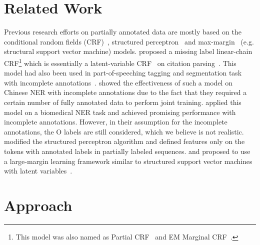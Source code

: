 \section{Related Work}
Previous research efforts on partially annotated data are mostly based on the conditional random fields (CRF)~\cite{lafferty2001conditional}, structured perceptron~\cite{collins2002discriminative} and max-margin~\cite{tsochantaridis2005large} (e.g. structural support vector machine) models.
\citet{bellare2007learning} proposed a missing label linear-chain CRF\footnote{This model was also named as Partial CRF~\cite{carlson2009learning} and EM Marginal CRF~\cite{greenberg2018marginal}.} which is essentially a latent-variable CRF~\cite{quattoni2005conditional} on citation parsing~\cite{mccallum2000automating}.
This model had also been used in part-of-speeching tagging and segmentation task with incomplete annotations~\cite{tsuboi-EtAl:2008:PAPERS, liu-EtAl:2014:EMNLP2014,yang2014semi}. 
\citet{yang2018distantly} showed the effectiveness of such a model on Chinese NER with incomplete annotations due to the fact that they required a certain number of fully annotated data to perform joint training. 
\citet{greenberg2018marginal} applied this model on a biomedical NER task and achieved promising performance with incomplete annotations. 
However, in their assumption for the incomplete annotations, the \textsc{O} labels are still considered, which we believe is not realistic. 
\citet{carlson2009learning} modified the structured perceptron algorithm and defined features only on the tokens with annotated labels in partially labeled sequences. 
\citet{fernandes2011learning} and \citet{lou2012structured} proposed to use a large-margin learning framework similar to structured support vector machines with latent variables~\cite{yu2009learning}. 




\section{Approach}
\label{sec:problem}

